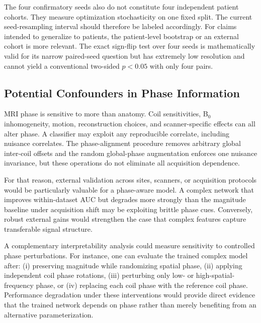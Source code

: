 \documentclass[journal]{IEEEtran}
\begin{document}
The four confirmatory seeds also do not constitute four independent patient cohorts. They measure optimization stochasticity on one fixed split. The current seed-resampling interval should therefore be labeled accordingly. For claims intended to generalize to patients, the patient-level bootstrap or an external cohort is more relevant. The exact sign-flip test over four seeds is mathematically valid for its narrow paired-seed question but has extremely low resolution and cannot yield a conventional two-sided $p<0.05$ with only four pairs.

\subsection{Potential Confounders in Phase Information}
MRI phase is sensitive to more than anatomy. Coil sensitivities, B$_0$ inhomogeneity, motion, reconstruction choices, and scanner-specific effects can all alter phase. A classifier may exploit any reproducible correlate, including nuisance correlates. The phase-alignment procedure removes arbitrary global inter-coil offsets and the random global-phase augmentation enforces one nuisance invariance, but these operations do not eliminate all acquisition dependence.

For that reason, external validation across sites, scanners, or acquisition protocols would be particularly valuable for a phase-aware model. A complex network that improves within-dataset AUC but degrades more strongly than the magnitude baseline under acquisition shift may be exploiting brittle phase cues. Conversely, robust external gains would strengthen the case that complex features capture transferable signal structure.

A complementary interpretability analysis could measure sensitivity to controlled phase perturbations. For instance, one can evaluate the trained complex model after: (i) preserving magnitude while randomizing spatial phase, (ii) applying independent coil phase rotations, (iii) perturbing only low- or high-spatial-frequency phase, or (iv) replacing each coil phase with the reference coil phase. Performance degradation under these interventions would provide direct evidence that the trained network depends on phase rather than merely benefiting from an alternative parameterization.
\end{document}

